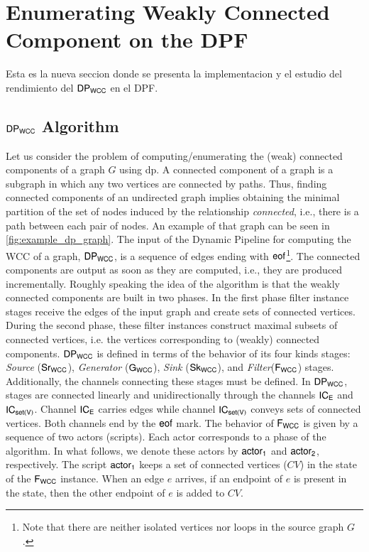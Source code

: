\section{Enumerating Weakly Connected Component on the DPF}\label{sec:wcc-dpf}

Esta es la nueva seccion donde se presenta la implementacion y el estudio del rendimiento del $\mathsf{DP_{WCC}}$ en el DPF.

   
\subsection{$\mathsf{DP_{WCC}}$ Algorithm}
  Let us consider the problem of computing/enumerating the (weak) connected components of a graph $G$ using \acrshort{dp}. 
  A connected component of a graph is a subgraph in which any two vertices are connected by paths.  
  Thus, finding connected components of an undirected graph implies obtaining the minimal partition of the set of nodes induced by the relationship \textit{connected}, i.e., there is a path between each pair of nodes. An example of that graph can be seen in \autoref{fig:example_dp_graph}.
  The input of the Dynamic Pipeline for computing the WCC of a graph, $\mathsf{DP_{WCC}}$, is a sequence of edges ending with $\mathsf{eof}$\footnote{Note that there are neither isolated vertices nor loops in the source graph $G$.}. The connected components are output as soon as they are computed, i.e., they are produced incrementally. 
  Roughly speaking the idea of the algorithm is that the weakly connected components are built in two phases. In the first phase filter instance stages receive the edges of the input graph and create sets of connected vertices. 
  During the second phase, these filter instances construct maximal subsets of connected vertices, i.e. the vertices corresponding to (weakly) connected components.
  $\mathsf{DP_{WCC}}$ is defined in terms of the behavior of its four kinds stages: \textit{Source} ($\mathsf{Sr_{WCC}}$),  \textit{Generator} ($\mathsf{G_{WCC}}$),  \textit{Sink} ($\mathsf{Sk_{WCC}}$), and \textit{Filter}($\mathsf{F_{WCC}}$) stages. Additionally,  the channels connecting these stages must be defined. 
  In $\mathsf{DP_{WCC}}$, stages are connected linearly and unidirectionally through the channels $\mathsf{IC_E}$ and  $\mathsf{IC_{set(V)}}$. Channel $\mathsf{IC_E}$ carries edges while channel  $\mathsf{IC_{set(V)}}$ conveys sets of connected vertices. Both channels end by the $\mathsf{eof}$ mark. 
  The behavior of $\mathsf{F_{WCC}}$ is given by a sequence of two actors (scripts). Each actor corresponds to a phase of the algorithm. In what follows, we denote these actors by $\mathsf{actor_1}$ and $\mathsf{actor_2}$, respectively. 
  The script $\mathsf{actor_1}$ keeps a set of connected vertices ($CV$) in the state of the $\mathsf{F_{WCC}}$ instance. When an edge $e$ arrives, if an endpoint of $e$ is present in the state, then the other endpoint of $e$ is added to $CV$. 
